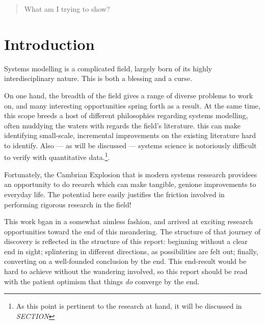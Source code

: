 \documentclass[draft]{article}
\begin{document}
\maketitle

\begin{abstract}
  What am I trying to show?
\end{abstract}

\section{Introduction}
\label{sec:introduction}
Systems modelling is a
complicated field, largely born of its highly interdisciplinary nature. This is
both a blessing and a curse.\par


On one hand, the breadth of the field gives a range of diverse problems to work
on, and many interesting opportunities spring forth as a result. At the same
time, this scope breeds a host of different philosophies regarding systems
modelling, often muddying the waters with regards the field's literature. this
can make identifying small-scale, incremental improvements on the existing
literature hard to identify. Also --- as will be discussed --- systems science
is notoriously difficult to verify with quantitative data.\footnote{As this
  point is pertinent to the research at hand, it will be discussed in
  \emph{SECTION}}.\par

Fortunately, the Cambrian Explosion that is modern systems ressearch providees
an opportunity to do reearch which can make tangible, genione improvements to
everyday life. The potential here easily justifies the friction involved in
performing rigorous research in the field!\par

This work bgan in a somewhat aimless fashion, and arrived at exciting research
opportunities toward the end of this meandering. The structure of that journey
of discovery is reflected in the structure of this report: beginning without a
clear end in sight; splintering in different directions, as possibilities are
felt out; finally, converting on a well-founded conclusion by the end. This
end-result would be hard to achieve without the wandering involved, so this
report should be read with the patient optimism that things \emph{do} converge
by the end.\par
\end{document}
